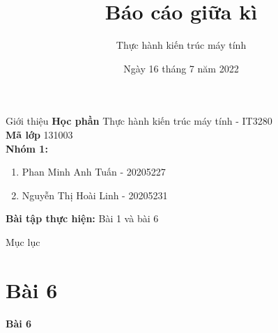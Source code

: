 \documentclass[aspectratio=43,xcolor=dvipsnames]{beamer}
\title[short title]{Báo cáo giữa kì} %
\subtitle{\Large{Thực hành kiến trúc máy tính}}
\institute[HUST] %
{\normalsize{
    Trường Công nghệ Thông tin và Truyền thông \\
    Đại học Bách Khoa Hà Nội
    }
}
\date{Ngày 16 tháng 7 năm 2022} %
\begin{document}
\begin{frame}
    \titlepage
\end{frame}
\begin{frame}{Giới thiệu}
    \textbf{Học phần} Thực hành kiến trúc máy tính - IT3280 \\\textbf{Mã lớp} 131003\\
    \textbf{Nhóm 1:}
    \begin{enumerate}
        \item Phan Minh Anh Tuấn - 20205227
        \item Nguyễn Thị Hoài Linh - 20205231
    \end{enumerate}
    \textbf{Bài tập thực hiện:} Bài 1 và bài 6
\end{frame}
\begin{frame}{Mục lục}
    \tableofcontents
\end{frame}

\section{Bài 6}


\begin{frame}
    \textcolor{structure}{\Huge{\centerline{\textbf{Bài 6}}}}
\end{frame}
\end{document}
